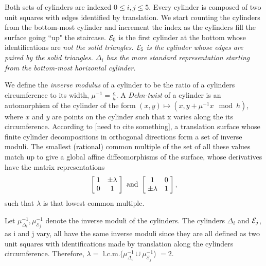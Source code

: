 \documentclass[]{article}
\begin{document}
Both sets of cylinders are indexed $0\leq i, j \leq 5$. Every cylinder is composed of two unit squares with edges identified by translation. We start counting the cylinders from the bottom-most cylinder and increment the index as the cylinders fill the surface going ``up" the staircase. $\small{\mathcal{E}}_0$ is the first cylinder at the bottom whose identifications are \em{not} \normalfont the solid triangles. $\small{\mathcal{E}}_5$ is the cylinder whose edges are paired by the solid triangles. $\Delta_{i}$ has the more standard representation starting from the bottom-most horizontal cylinder. 

We define the \emph{inverse modulus} of a cylinder to be the ratio of a cylinders circumference to its width, $\mu^{-1}=\frac{c}{h}$. A \emph{Dehn-twist} of a cylinder is an automorphism of the cylinder of the form  $(x,y)\mapsto(x,y+\mu^{-1} x \mod{h})$, where $x$ and $y$ are points on the cylinder such that x varies along the its circumference. According to [need to cite something], a translation surface whose finite cylinder decompositions in orthogonal directions form a set of inverse moduli. The smallest (rational) common multiple of the set of all these values match up to give a global affine diffeomorphisms of the surface, whose derivatives have the matrix representations
\begin{equation*}
\left[ \hspace{1mm} \begin{matrix}
				1 & \pm \lambda\\
				0 & 1
			\end{matrix}\hspace{1mm}\right] \text{ and }
			\left[ \hspace{1mm} \begin{matrix}
							1 & 0\\
							\pm \lambda & 1
						\end{matrix}\hspace{1mm}\right],
\end{equation*}
such that $\lambda$ is that lowest common multiple.

Let $\mu^{-1}_{\Delta_i},\mu^{-1}_{\mathcal{E}_j}$ denote the inverse moduli of the cylinders. The cylinders $\Delta_{i}$ and $\small{\mathcal{E}}_j$, as i and j vary, all have the same inverse moduli since they are all defined as two unit squares with identifications made by translation along the cylinders circumference. Therefore, $\lambda=$ l.c.m.($\mu^{-1}_{\Delta_i}\cup\mu^{-1}_{\mathcal{E}_j}$) $=2$.
\end{document}
